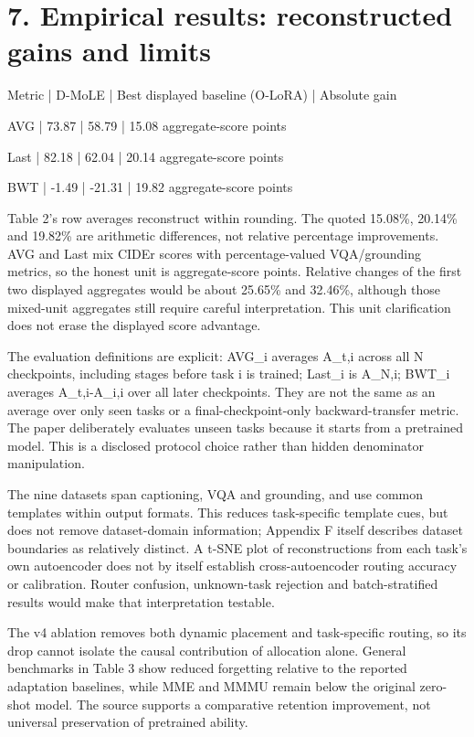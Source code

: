 \documentclass[10pt]{article}
\begin{document}
\section*{7. Empirical results: reconstructed gains and limits}
Metric | D-MoLE | Best displayed baseline (O-LoRA) | Absolute gain\par
AVG | 73.87 | 58.79 | 15.08 aggregate-score points\par
Last | 82.18 | 62.04 | 20.14 aggregate-score points\par
BWT | -1.49 | -21.31 | 19.82 aggregate-score points\par
Table 2’s row averages reconstruct within rounding. The quoted 15.08\%, 20.14\% and 19.82\% are arithmetic differences, not relative percentage improvements. AVG and Last mix CIDEr scores with percentage-valued VQA/grounding metrics, so the honest unit is aggregate-score points. Relative changes of the first two displayed aggregates would be about 25.65\% and 32.46\%, although those mixed-unit aggregates still require careful interpretation. This unit clarification does not erase the displayed score advantage.\par
The evaluation definitions are explicit: AVG\_i averages A\_t,i across all N checkpoints, including stages before task i is trained; Last\_i is A\_N,i; BWT\_i averages A\_t,i-A\_i,i over all later checkpoints. They are not the same as an average over only seen tasks or a final-checkpoint-only backward-transfer metric. The paper deliberately evaluates unseen tasks because it starts from a pretrained model. This is a disclosed protocol choice rather than hidden denominator manipulation.\par
The nine datasets span captioning, VQA and grounding, and use common templates within output formats. This reduces task-specific template cues, but does not remove dataset-domain information; Appendix F itself describes dataset boundaries as relatively distinct. A t-SNE plot of reconstructions from each task’s own autoencoder does not by itself establish cross-autoencoder routing accuracy or calibration. Router confusion, unknown-task rejection and batch-stratified results would make that interpretation testable.\par
The v4 ablation removes both dynamic placement and task-specific routing, so its drop cannot isolate the causal contribution of allocation alone. General benchmarks in Table 3 show reduced forgetting relative to the reported adaptation baselines, while MME and MMMU remain below the original zero-shot model. The source supports a comparative retention improvement, not universal preservation of pretrained ability.\par
\end{document}
